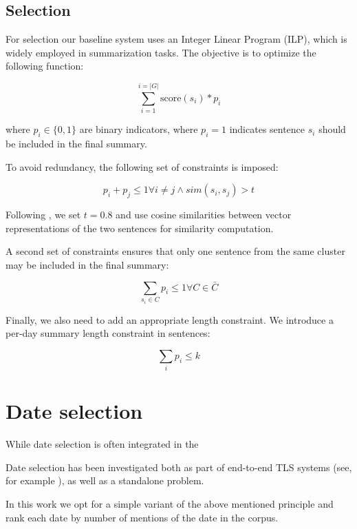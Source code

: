 \documentclass[a4paper,BCOR=10mm]{report}
\begin{document}
\subsection{Selection}

For selection our baseline system uses an Integer Linear Program (ILP), which is widely employed in summarization tasks.
The objective is to optimize the following function:

\begin{displaymath}
\sum_{i = 1}^{i = |G|} \text{score}(s_i) * p_i
\end{displaymath}

where $p_i \in \{0, 1\}$ are binary indicators, where $p_i = 1$ indicates sentence $s_i$ should be included in the final summary.

To avoid redundancy, the following set of constraints is imposed:

\begin{displaymath}
p_i + p_{j} \leq 1 \forall i \neq j \land sim(s_i, s_j) > t
\end{displaymath}

Following \citet{banerjee}, we set $t = 0.8$ and use cosine similarities between vector representations of the two sentences for similarity computation.

A second set of constraints ensures that only one sentence from the same cluster may be included in the final summary:

\begin{displaymath}
\sum_{s_i \in C} p_i \leq 1 \forall C \in \bar{C}
\end{displaymath}

Finally, we also need to add an appropriate length constraint. We introduce a per-day summary length constraint in sentences:

\begin{displaymath}
\sum_{i} p_i \leq k
\end{displaymath}


\section{Date selection}

While date selection is often integrated in the 

Date selection has been investigated both as part of end-to-end TLS systems (see, for example \citet{trans}), as well as a standalone problem.


In this work we opt for a simple variant of the above mentioned principle and rank each date by number of mentions of the date in the corpus.
\end{document}
